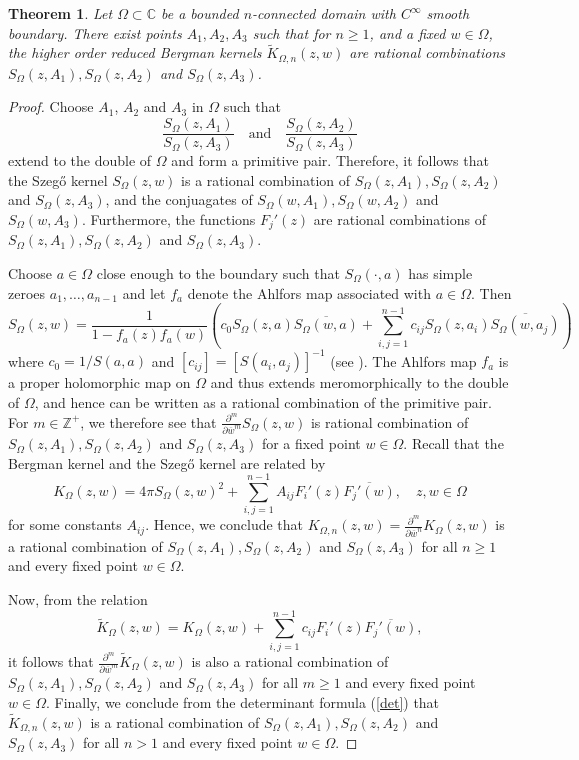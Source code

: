 \documentclass[11pt, reqno]{amsart}
\newtheorem{thm}{Theorem}[section]
\numberwithin{equation}{section}
\newcommand{\ov}{\overline}
\begin{document}
\begin{thm}
Let $\Omega\subset\mathbb{C}$ be a bounded $n$-connected domain with $C^{\infty}$ smooth boundary. There exist points $A_1,A_2,A_3$ such that for $n\geq 1$, and a fixed $w \in \Omega$, the higher order reduced Bergman kernels $\tilde{K}_{\Omega,n}(z,w)$ are rational combinations $S_{\Omega}(z,A_1),S_{\Omega}(z,A_2)$ and $S_{\Omega}(z,A_3)$.
\end{thm}

\begin{proof}
Choose $A_1$, $A_2$ and $A_3$ in $\Omega$ such that
\[
\frac{S_{\Omega}(z,A_1)}{S_{\Omega}(z,A_3)}\quad\text{and}\quad\frac{S_{\Omega}(z,A_2)}{S_{\Omega}(z,A_3)}
\]
extend to the double of $\Omega$ and form a primitive pair. Therefore, it follows that
the Szeg\H{o} kernel $S_{\Omega}(z,w)$ is a rational combination of $S_{\Omega}(z,A_1),S_{\Omega}(z,A_2)$ and $S_{\Omega}(z,A_3)$, and the conjuagates of $S_{\Omega}(w,A_1),S_{\Omega}(w,A_2)$ and $S_{\Omega}(w,A_3)$. Furthermore, the functions $F_j'(z)$ are rational combinations of $S_{\Omega}(z,A_1),S_{\Omega}(z,A_2)$ and $S_{\Omega}(z,A_3)$.

\medskip

Choose $a\in\Omega$ close enough to the boundary such that $S_{\Omega}(\cdot,a)$ has simple zeroes $a_1,\ldots,a_{n-1}$ and let $f_a$ denote the Ahlfors map associated with $a\in\Omega$. Then
\[
S_{\Omega}(z,w)=\frac{1}{1-f_a(z)f_a(w)}
\left(
c_0 S_{\Omega}(z,a)\overline{S_{\Omega}(w,a)}+\sum_{i,j=1}^{n-1}c_{ij}S_{\Omega}(z,a_i)\overline{S_{\Omega}(w,a_j)}
\right)
\]
where $c_0 = 1/S(a,a)$ and $[c_{ij}]=[S(a_i,a_j)]^{-1}$ (see \cite{Be4}).
The Ahlfors map $f_a$ is a proper holomorphic map on $\Omega$ and thus extends meromorphically to the double of $\Omega$, and hence can be written as a rational combination of the primitive pair. 
For $m\in\mathbb{Z}^+$, we therefore see that $\frac{\partial^m}{\partial \ov{w}^m}S_{\Omega}(z,w)$ is rational combination of $S_{\Omega}(z,A_1),S_{\Omega}(z,A_2)$ and $S_{\Omega}(z,A_3)$ for a fixed point $w\in\Omega$. Recall that the Bergman kernel and the Szegő kernel are related by
\[
K_{\Omega}(z,w)=4\pi S_{\Omega}(z,w)^2+\sum_{i,j=1}^{n-1}A_{ij}F_i'(z)\overline{F_j'(w)}, \quad z,w\in\Omega
\]
for some constants $A_{ij}$. Hence, we conclude that $K_{\Omega,n}(z,w)=\frac{\partial^m}{\partial \ov{w}^n}K_{\Omega}(z,w)$ is a rational combination of $S_{\Omega}(z,A_1),S_{\Omega}(z,A_2)$ and $S_{\Omega}(z,A_3)$ for all $n\geq 1$ and every fixed point $w\in\Omega$.

\medskip

Now, from the relation
\[
\tilde{K}_{\Omega}(z,w) = K_{\Omega}(z,w) + \sum_{i,j=1}^{n-1} c_{ij} F_i'(z) \overline{F_j'(w)},
\]
it follows that $\frac{\partial^m}{\partial \ov{w}^m}\tilde{K}_{\Omega}(z,w)$ is also a rational combination of $S_{\Omega}(z,A_1),S_{\Omega}(z,A_2)$ and $S_{\Omega}(z,A_3)$ for all $m\geq 1$ and every fixed point $w\in\Omega$. Finally, we conclude from the determinant formula (\ref{det}) that 
$\tilde{K}_{\Omega,n}(z,w)$ is a rational combination of $S_{\Omega}(z,A_1),S_{\Omega}(z,A_2)$ and $S_{\Omega}(z,A_3)$ for all $n> 1$ and every fixed point $w\in\Omega$.
\end{proof}
\end{document}
